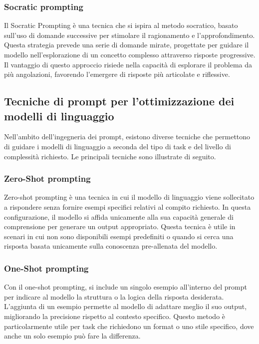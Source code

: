 \documentclass[target=mst,aauheader=,style=]{thud}
\begin{document}
\subsubsection{Socratic prompting}
Il Socratic Prompting è una tecnica che si ispira al metodo socratico, basato sull'uso di domande successive per stimolare il ragionamento e l’approfondimento. Questa strategia prevede una serie di domande mirate, progettate per guidare il modello nell’esplorazione di un concetto complesso attraverso risposte progressive. Il vantaggio di questo approccio risiede nella capacità di esplorare il problema da più angolazioni, favorendo l’emergere di risposte più articolate e riflessive.

\subsection{Tecniche di prompt per l'ottimizzazione dei modelli di linguaggio}
Nell’ambito dell’ingegneria dei prompt, esistono diverse tecniche che permettono di guidare i modelli di linguaggio a seconda del tipo di task e del livello di complessità richiesto. Le principali tecniche sono illustrate di seguito.

\subsubsection{Zero-Shot prompting}
Zero-shot prompting è una tecnica in cui il modello di linguaggio viene sollecitato a rispondere senza fornire esempi specifici relativi al compito richiesto. In questa configurazione, il modello si affida unicamente alla sua capacità generale di comprensione per generare un output appropriato. Questa tecnica è utile in scenari in cui non sono disponibili esempi predefiniti o quando si cerca una risposta basata unicamente sulla conoscenza pre-allenata del modello.

\subsubsection{One-Shot prompting}
Con il one-shot prompting, si include un singolo esempio all’interno del prompt per indicare al modello la struttura o la logica della risposta desiderata. L’aggiunta di un esempio permette al modello di adattare meglio il suo output, migliorando la precisione rispetto al contesto specifico. Questo metodo è particolarmente utile per task che richiedono un format o uno stile specifico, dove anche un solo esempio può fare la differenza.
\end{document}
